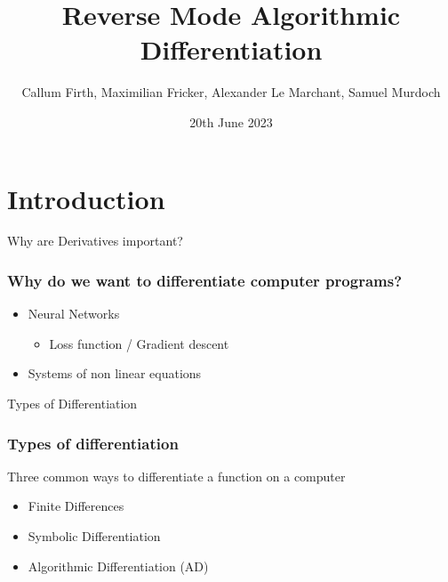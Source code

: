 \documentclass{beamer}
\title{Reverse Mode Algorithmic Differentiation}
\author[Group 18]{Callum Firth, Maximilian Fricker, Alexander Le Marchant, Samuel Murdoch}
\institute[Imperial]{Imperial College London}
\date{20th June 2023}
\begin{document}
\frame{\titlepage}



% 





\section{Introduction}

\begin{frame}{Why are Derivatives important?}
\frametitle{Why do we want to differentiate computer programs?}
\begin{itemize}
    \item Neural Networks
    \begin{itemize}
        \item Loss function / Gradient descent
    \end{itemize}
    \item Systems of non linear equations
\end{itemize}
\end{frame}

\begin{frame}{Types of Differentiation}
\frametitle{Types of differentiation}
Three common ways to differentiate a function on a computer
\begin{itemize}
    \item Finite Differences
    \item Symbolic Differentiation
    \item Algorithmic Differentiation (AD)
\end{itemize}
\end{frame}
\end{document}
